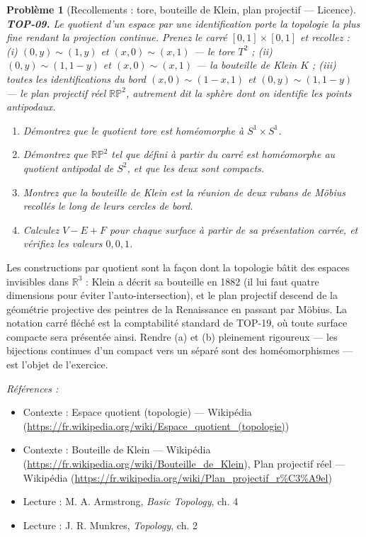 \documentclass[11pt]{article}
\newtheorem{problem}{Problème}
\newenvironment{refs}{\par\small\noindent\emph{Références :}\begin{itemize}\setlength\itemsep{0pt}}{\end{itemize}\normalsize}
\begin{document}
\begin{problem}[{Recollements : tore, bouteille de Klein, plan projectif --- Licence}]
\textbf{TOP-09.} Le quotient d'un espace par une identification porte la topologie la plus fine
rendant la projection continue. Prenez le carré $ [0,1] \times [0,1] $ et recollez : (i)
$ (0,y) \sim (1,y) $ et $ (x,0) \sim (x,1) $ --- le tore $ T^2 $ ; (ii)
$ (0,y) \sim (1, 1-y) $ et $ (x,0) \sim (x,1) $ --- la bouteille de Klein $ K $ ; (iii) toutes les
identifications du bord $ (x, 0) \sim (1-x, 1) $ et $ (0, y) \sim (1, 1-y) $ --- le plan projectif
réel $ \mathbb{RP}^2 $, autrement dit la sphère dont on identifie les points antipodaux.
\begin{enumerate}
\item[(a)] Démontrez que le quotient tore est homéomorphe à $ S^1 \times S^1 $.
\item[(b)] Démontrez que $ \mathbb{RP}^2 $ tel que défini à partir du carré est homéomorphe au quotient
antipodal de $ S^2 $, et que les deux sont compacts.
\item[(c)] Montrez que la bouteille de Klein est la réunion de deux rubans de Möbius recollés le long de
leurs cercles de bord.
\item[(d)] Calculez $ V - E + F $ pour chaque surface à partir de sa présentation carrée, et vérifiez les
valeurs $ 0, 0, 1 $.
\end{enumerate}

\end{problem}

\noindent Les constructions par quotient sont la façon dont la topologie bâtit des espaces
invisibles dans $ \mathbb{R}^3 $ : Klein a décrit sa bouteille en 1882 (il lui faut quatre dimensions
pour éviter l'auto-intersection), et le plan projectif descend de la géométrie projective des peintres de
la Renaissance en passant par Möbius. La notation \og{} carré fléché \fg{} est la comptabilité standard de
TOP-19, où toute surface compacte sera présentée ainsi. Rendre (a) et (b) pleinement rigoureux --- les
bijections continues d'un compact vers un séparé sont des homéomorphismes --- est l'objet de
l'exercice.

\begin{refs}
\item Contexte : Espace quotient (topologie) --- Wikipédia (\url{https://fr.wikipedia.org/wiki/Espace_quotient_(topologie)})
\item Contexte : Bouteille de Klein --- Wikipédia (\url{https://fr.wikipedia.org/wiki/Bouteille_de_Klein}), Plan projectif réel --- Wikipédia (\url{https://fr.wikipedia.org/wiki/Plan_projectif_r%C3%A9el})
\item Lecture : M. A. Armstrong, \textit{Basic Topology}, ch. 4
\item Lecture : J. R. Munkres, \textit{Topology}, ch. 2
\end{refs}
\end{document}
